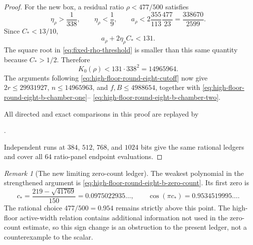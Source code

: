 \documentclass[11pt]{article}
\theoremstyle{remark}
\newtheorem{remark}[theorem]{Remark}
\begin{document}
\begin{proof}
For the new box, a residual ratio $\rho<477/500$ satisfies
\[
 \eta_\rho>\frac1{338},\qquad \eta_\rho<\frac19,
 \qquad
 a_\rho<2\frac{355}{113}\frac{477}{23}
 =\frac{338670}{2599}.
\]
Since $C_*<13/10$,
\[
 a_\rho+2\eta_\rho C_*<131.
\]
The square root in \eqref{eq:fixed-rho-threshold} is smaller than this
same quantity because $C_*>1/2$.  Therefore
\begin{equation}
 \boxed{K_0(\rho)<131\mathbin{\cdot}338^2=14965964.}
 \label{eq:high-floor-round-eight-b-cutoff}
\end{equation}
The arguments following
\eqref{eq:high-floor-round-eight-cutoff} now give
$2r\leq29931927$, $n\leq14965963$, and
$f,B\leq4988654$, together with
\eqref{eq:high-floor-round-eight-b-chamber-one}--%
\eqref{eq:high-floor-round-eight-b-chamber-two}.

All directed and exact comparisons in this proof are replayed by
\begin{center}
 \small{}.
\end{center}
Independent runs at $384$, $512$, $768$, and $1024$ bits give the same
rational ledgers and cover all $64$ ratio-panel endpoint evaluations.
\end{proof}

\begin{remark}[The new limiting zero-count ledger]
\label{rem:high-floor-round-eight-b-obstruction}
The weakest polynomial in the strengthened argument is
\eqref{eq:high-floor-round-eight-b-zero-count}.  Its first zero is
\[
 c_*=\frac{219-\sqrt{41769}}{150}
 =0.0975022935\ldots,\qquad
 \cos(\pi c_*)=0.9534519995\ldots.
\]
The rational choice $477/500=0.954$ remains strictly above this point.
The high-floor active-width relation contains additional information not
used in the zero-count estimate, so this sign change is an obstruction to
the present ledger, not a counterexample to the scalar.
\end{remark}
\end{document}
